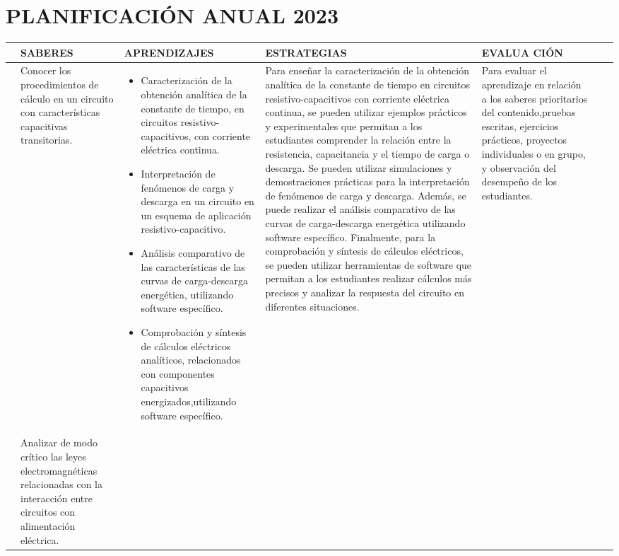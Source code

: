 \documentclass[../main]{subfiles}
\newcommand{\vertical}[1]{\rotatebox[origin=r]{90}{#1}}
\newcommand{\tiempos}{\vertical{6 semanas}}
\newcommand{\evaluacion}{Para evaluar el aprendizaje en relación a los saberes prioritarios del contenido,pruebas escritas, ejercicios prácticos, proyectos individuales o en
grupo, y observación del desempeño de los estudiantes.}
\newcommand{\recursos}{\vertical{Pizarrón, proyectores, videos, simuladores, libros de texto, materiales manipulativos y plataformas digitales}}
\begin{document}
\newpage


\section{PLANIFICACIÓN ANUAL 2023}
\centering
\begin{longtable}[h!]{|p{.3cm}|p{1.5cm}|p{4cm}|p{4cm}|p{1.5cm}|p{.5cm}|p{.5cm}|}
\hline
\vertical{EJE} & SABERES & APRENDIZAJES & ESTRATEGIAS & EVALUA CIÓN & \vertical{RECURSOS} & \vertical{TIEMPOS} \\
\endhead
\hline
\vertical{CIRCUITOS RESISTIVO- CAPACITIVOS} & Conocer los
procedimientos de cálculo
en un circuito con
características capacitivas
transitorias. & \begin{itemize}\item Caracterización de la obtención analítica de la constante
de tiempo, en circuitos resistivo-capacitivos, con corriente
eléctrica continua.\item Interpretación de fenómenos de carga y descarga en un
circuito en un esquema de aplicación resistivo-capacitivo.
\item Análisis comparativo de las características de las curvas
de carga-descarga energética, utilizando software
específico.
\item Comprobación y síntesis de cálculos eléctricos analíticos,
relacionados con componentes capacitivos energizados,utilizando software específico. \end{itemize} & Para enseñar la caracterización de la obtención analítica de la constante de tiempo en circuitos resistivo-capacitivos con corriente eléctrica continua, se pueden utilizar ejemplos prácticos y experimentales que permitan a los estudiantes comprender la relación entre la resistencia, capacitancia y el tiempo de carga o descarga. Se pueden utilizar simulaciones y demostraciones prácticas para la interpretación de fenómenos de carga y descarga. Además, se puede realizar el análisis comparativo de las curvas de carga-descarga energética utilizando software específico. Finalmente, para la comprobación y síntesis de cálculos eléctricos, se pueden utilizar herramientas de software que permitan a los estudiantes realizar cálculos más precisos y analizar la respuesta del circuito en diferentes situaciones. & \evaluacion & \recursos & \tiempos \\
\hline
\vertical{INDUCCIÓN ELECTROMAGNÉTICA} & Analizar de modo crítico las
leyes electromagnéticas
relacionadas con la interacción entre circuitos
con alimentación eléctrica. & \begin{itemize}

\end{itemize}
\end{longtable}
\end{document}
